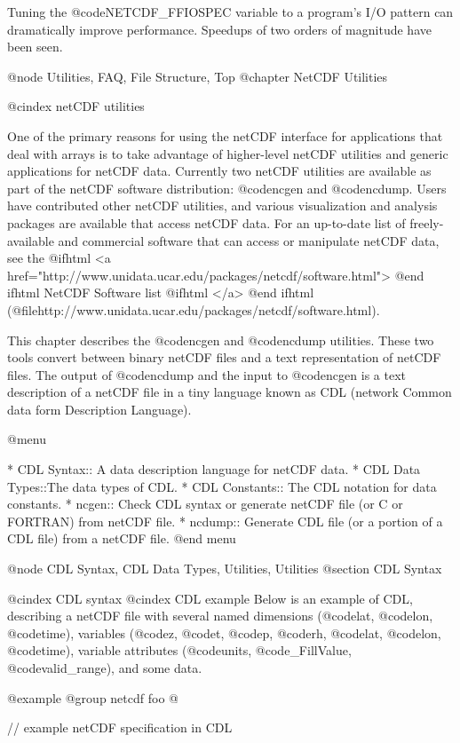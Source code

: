 {Tuning the @code{NETCDF_FFIOSPEC} variable to a program's I/O pattern
can dramatically improve performance.
Speedups of two orders of magnitude have been seen.

@node Utilities, FAQ, File Structure, Top
@chapter NetCDF Utilities

@cindex netCDF utilities

One of the primary reasons for using the netCDF interface for
applications that deal with arrays is to
take advantage of higher-level netCDF utilities and generic applications
for netCDF data.  Currently two netCDF utilities are available as part
of the netCDF software distribution: @code{ncgen} and @code{ncdump}.
Users have contributed other netCDF utilities, and various visualization
and analysis packages are available that access netCDF data.  For an
up-to-date list of freely-available and commercial software
that can access or manipulate netCDF data, see the
@ifhtml
<a href="http://www.unidata.ucar.edu/packages/netcdf/software.html">
@end ifhtml
NetCDF Software list
@ifhtml
</a>
@end ifhtml
(@file{http://www.unidata.ucar.edu/packages/netcdf/software.html}).


This chapter describes the @code{ncgen} and @code{ncdump} utilities.
These two tools convert between binary netCDF files and a text
representation of netCDF files.  The output of @code{ncdump} and the
input to @code{ncgen} is a text description of a netCDF file in a tiny
language known as CDL (network Common data form Description Language).

@menu

* CDL Syntax::    A data description language for netCDF data.
* CDL Data Types::The data types of CDL.
* CDL Constants:: The CDL notation for data constants.
* ncgen::         Check CDL syntax or generate netCDF file (or C or FORTRAN)
                  from netCDF file.
* ncdump::        Generate CDL file (or a portion of a CDL file) from a netCDF
                  file.
@end menu

@node CDL Syntax, CDL Data Types, Utilities, Utilities
@section CDL Syntax

@cindex CDL syntax
@cindex CDL example
Below is an example of CDL, describing a netCDF file with several named
dimensions (@code{lat}, @code{lon}, @code{time}), variables
(@code{z}, @code{t}, @code{p}, @code{rh}, @code{lat}, @code{lon},
@code{time}), variable attributes (@code{units}, @code{_FillValue},
@code{valid_range}), and some data.

@example
@group
netcdf foo @{    // example netCDF specification in CDL

}}
